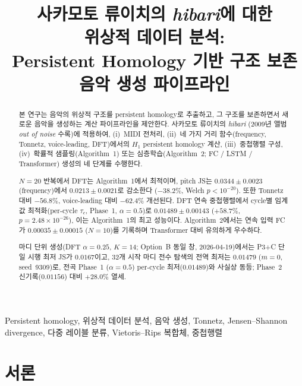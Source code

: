 \documentclass[conference,10pt,a4paper]{IEEEtran}
\title{사카모토 류이치의 \emph{hibari}에 대한\\위상적 데이터 분석:\\
       Persistent Homology 기반 구조 보존 음악 생성 파이프라인}
\author{\IEEEauthorblockN{김민주}
\IEEEauthorblockA{초학제 독립연구단\\
고등과학원 (KIAS)\\
서울, 대한민국}
}
\begin{document}
\maketitle

\begin{abstract}
본 연구는 음악의 위상적 구조를 persistent homology로 추출하고,
그 구조를 보존하면서 새로운 음악을 생성하는 계산 파이프라인을 제안한다.
사카모토 류이치의 \emph{hibari} (2009년 앨범 \emph{out of noise} 수록)에
적용하여, (i)~MIDI 전처리, (ii)~네 가지 거리 함수(frequency, Tonnetz,
voice-leading, DFT)에서의 $H_1$ persistent homology 계산,
(iii)~중첩행렬 구성, (iv)~확률적 샘플링(Algorithm~1) 또는
심층학습(Algorithm~2; FC / LSTM / Transformer) 생성의 네 단계를 수행한다.

$N=20$ 반복에서 DFT는 Algorithm~1에서 최적이며, pitch JS는
$0.0344 \pm 0.0023$ (frequency)에서 $0.0213 \pm 0.0021$로 감소한다
($-38.2\%$, Welch $p < 10^{-20}$). 또한 Tonnetz 대비 $-56.8\%$,
voice-leading 대비 $-62.4\%$ 개선된다.
DFT 연속 중첩행렬에서 cycle별 임계값 최적화(per-cycle $\tau_c$, Phase~1, $\alpha=0.5$)로
$0.01489 \pm 0.00143$ ($+58.7\%$, $p=2.48\times 10^{-26}$),
이는 Algorithm~1의 최고 성능이다.
Algorithm~2에서는 연속 입력 FC가
$\mathbf{0.00035 \pm 0.00015}$ ($N=10$)를 기록하며
Transformer 대비 유의하게 우수하다.

마디 단위 생성(DFT $\alpha=0.25$, $K=14$; Option~B 동일 창, 2026-04-19)에서는
P3+C 단일 시행 최저 JS가 $0.0167$이고,
32개 시작 마디 전수 탐색의 전역 최저는 $0.01479$ ($m=0$, seed~9309)로,
전곡 Phase~1 ($\alpha=0.5$) per-cycle 최저($0.01489$)와 사실상 동등; Phase~2 신기록($0.01156$) 대비 $+28.0\%$ 열세.
\end{abstract}

\begin{IEEEkeywords}
Persistent homology, 위상적 데이터 분석, 음악 생성,
Tonnetz, Jensen--Shannon divergence, 다중 레이블 분류,
Vietoris--Rips 복합체, 중첩행렬
\end{IEEEkeywords}

\section{서론}
\label{sec:intro}
\end{document}
